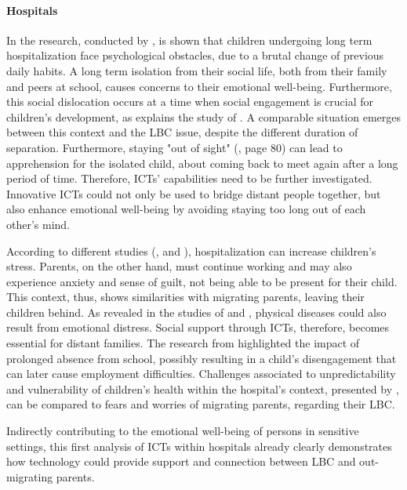 \paragraph{Hospitals}
In the research, conducted by \textcite{wadley2014exploring}, is shown that children undergoing long term hospitalization face psychological obstacles, due to a brutal change of previous daily habits. A long term isolation from their social life, both from their family and peers at school, causes concerns to their emotional well-being. Furthermore, this social dislocation occurs at a time when social engagement is crucial for children’s development, as explains the study of \textcite{hopkins2014embedding}. A comparable situation emerges between this context and the LBC issue, despite the different duration of separation. Furthermore, staying "out of sight" (\cite{yates2010keeping}, page 80) can lead to apprehension for the isolated child, about coming back to meet again after a long period of time. Therefore, ICTs' capabilities need to be further investigated. Innovative ICTs could not only be used to bridge distant people together, but also enhance emotional well-being by avoiding staying too long out of each other's mind. 

According to different studies (\cite{vernon1971psychological}, \cite{bossert1994stress} and \cite{thomson2012body}), hospitalization can increase children's stress. Parents, on the other hand, must continue working and may also experience anxiety and sense of guilt, not being able to be present for their child. This context, thus, shows similarities with migrating parents, leaving their children behind. As revealed in the studies of \textcite{stewart1998emotional} and \textcite{ryan2001happiness}, physical diseases could also result from emotional distress. Social support through ICTs, therefore, becomes essential for distant families. The research from \textcite{hopkins2013hospitalised} highlighted the impact of prolonged absence from school, possibly resulting in a child’s disengagement that can later cause employment difficulties. Challenges associated to unpredictability and vulnerability of children’s health within the hospital's context, presented by \textcite{yates2010keeping}, can be compared to fears and worries of migrating parents, regarding their LBC. 

Indirectly contributing to the emotional well-being of persons in sensitive settings, this first analysis of ICTs within hospitals already clearly demonstrates how technology could provide support and connection between LBC and out-migrating parents. 

